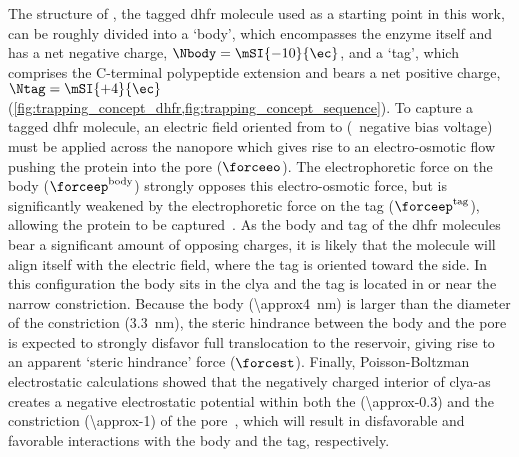 The structure of , the tagged \gls{dhfr} molecule used as a starting point in this work, can be
roughly divided into a `body', which encompasses the enzyme itself and has a net negative charge,
$\Nbody=\mSI{-10}{\ec}$, and a `tag', which comprises the C-terminal polypeptide extension and bears a net
positive charge, $\Ntag=\mSI{+4}{\ec}$ (\cref{fig:trapping_concept_dhfr,fig:trapping_concept_sequence}). To
capture a tagged \gls{dhfr} molecule, an electric field oriented from \cisi{} to \transi{} (\ie~negative bias
voltage) must be applied across the nanopore which gives rise to an electro-osmotic flow pushing the protein
into the pore ($\forceeo$). The electrophoretic force on the body ($\forceep^{\rm{body}}$) strongly opposes
this electro-osmotic force, but is significantly weakened by the electrophoretic force on the tag
($\forceep^{\rm{tag}}$), allowing the protein to be
captured~\cite{Soskine-2012,Soskine-Biesemans-2015,Biesemans-2015}. As the body and tag of the \gls{dhfr}
molecules bear a significant amount of opposing charges, it is likely that the molecule will align itself with
the electric field, where the tag is oriented toward the \transi{} side. In this configuration the body sits
in the \gls{clya} \lumen{} and the tag is located in or near the narrow constriction. Because the body
(\SI{\approx4}{\nm}) is larger than the diameter of the constriction (\SI{3.3}{\nm}), the steric hindrance
between the body and the pore is expected to strongly disfavor full translocation to the \transi{} reservoir,
giving rise to an apparent `steric hindrance' force ($\forcest$). Finally, Poisson-Boltzman electrostatic
calculations showed that the negatively charged interior of \gls{clya-as} creates a negative electrostatic
potential within both the \lumen{} (\SI{\approx-0.3}{\kTe}) and the constriction (\SI{\approx-1}{\kTe}) of the
pore~\cite{Franceschini-2016}, which will result in disfavorable and favorable interactions with the body and
the tag, respectively.

